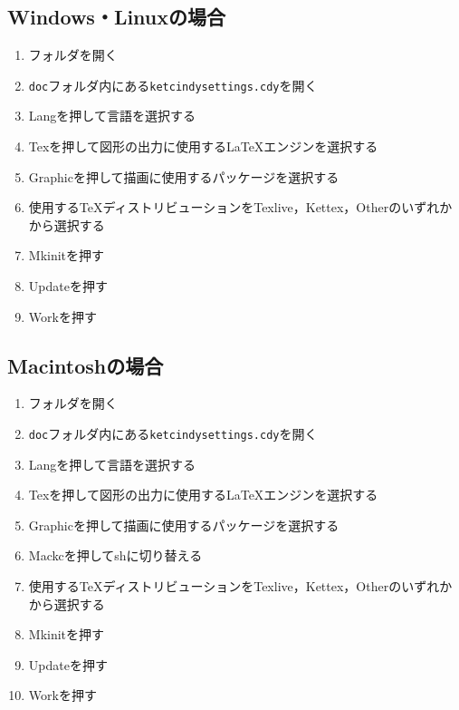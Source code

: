 \subsection{Windows・Linuxの場合}
\begin{enumerate}
    \item {\ketcindy}フォルダを開く
    \item \verb|doc|フォルダ内にある\verb|ketcindysettings.cdy|を開く
    \item Langを押して言語を選択する
    \item Texを押して図形の出力に使用する{\LaTeX}エンジンを選択する
    \item Graphicを押して描画に使用するパッケージを選択する
    \item 使用する{\TeX}ディストリビューションをTexlive，Kettex，Otherのいずれかから選択する
    \item Mkinitを押す
    \item Updateを押す
    \item Workを押す
\end{enumerate}

\newpage

\subsection{Macintoshの場合}
\begin{enumerate}
    \item {\ketcindy}フォルダを開く
    \item \verb|doc|フォルダ内にある\verb|ketcindysettings.cdy|を開く
    \item Langを押して言語を選択する
    \item Texを押して図形の出力に使用する{\LaTeX}エンジンを選択する
    \item Graphicを押して描画に使用するパッケージを選択する
    \item Mackcを押してshに切り替える
    \item 使用する{\TeX}ディストリビューションをTexlive，Kettex，Otherのいずれかから選択する
    \item Mkinitを押す
    \item Updateを押す
    \item Workを押す
\end{enumerate}
